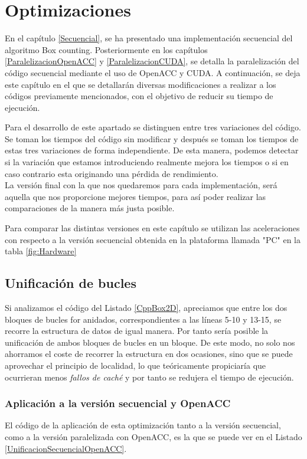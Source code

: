 \chapter{Optimizaciones}

En el capítulo \ref{Secuencial}, se ha presentado una implementación secuencial del algoritmo Box counting. Posteriormente en los capítulos \ref{ParalelizacionOpenACC} y \ref{ParalelizacionCUDA}, se detalla la paralelización del código secuencial mediante el uso de OpenACC y CUDA. A continuación, se deja este capítulo en el que se detallarán diversas modificaciones a realizar a los códigos previamente mencionados, con el objetivo de reducir su tiempo de ejecución. 

Para el desarrollo de este apartado se distinguen entre tres variaciones del código. Se toman los tiempos del código sin modificar y después se toman los tiempos de estas tres variaciones de forma independiente. De esta manera, podemos detectar si la variación que estamos introduciendo realmente mejora los tiempos o si en caso contrario esta originando una pérdida de rendimiento. \\

La versión final con la que nos quedaremos para cada implementación, será aquella que nos proporcione mejores tiempos, para así poder realizar las comparaciones de la manera más justa posible.

Para comparar las distintas versiones en este capítulo se utilizan las aceleraciones con respecto a la versión secuencial obtenida en la plataforma llamada "PC" en la tabla \ref{fig:Hardware}

\section{Unificación de bucles}
Si analizamos el código del Listado \ref{CppBox2D}, apreciamos que entre los dos bloques de bucles for anidados, correspondientes a las líneas 5-10 y 13-15, se recorre la estructura de datos de igual manera. Por tanto sería posible la unificación de ambos bloques de bucles en un bloque. De este modo, no solo nos ahorramos el coste de recorrer la estructura en dos ocasiones, sino que se puede aprovechar el principio de localidad, lo que teóricamente propiciaría que ocurrieran menos \textit{fallos de caché} y por tanto se redujera el tiempo de ejecución.

\subsection{Aplicación a la versión secuencial y OpenACC}
El código de la aplicación de esta optimización tanto a la versión secuencial, como a la versión paralelizada con OpenACC, es la que se puede ver en el Listado \ref{UnificacionSecuencialOpenACC}.

